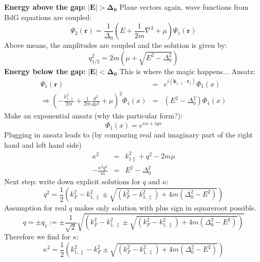 \textbf{Energy above the gap:} $\mathbf{ |E| > \Delta_0}$
Plane vectors again, wave functions from BdG equations are coupled:
\begin{equation}
\Psi_2 \left( \mathbf{r} \right)  = \frac{1}{\Delta_0} \left( E + \frac{1}{2m} \nabla^2 + \mu \right) \Psi_1 \left( \mathbf{r}  \right) 
\end{equation}
Above means, the amplitudes are coupled and the solution is given by:
\begin{equation}
q_{1/2}^2 = 2m \left( \mu + \sqrt{E^2 - \Delta_0^2} \right)
\end{equation}
\textbf{Energy below the gap:} $\mathbf{ |E| < \Delta_0}$
This is where the magic happens...
Ansatz:
\begin{eqnarray}
\Psi_1 \left( \mathbf{r} \right)  &=& e^{i ( \mathbf{k}_{1, \parallel} \cdot \mathbf{r}_{\parallel} ) } \Phi_1\left( x \right) \\
\Rightarrow \left( - \frac{k_{1, \parallel}^2}{2m} + \frac{1}{2m} \frac{d^2}{dx^2} + \mu \right)^2 \Phi_1\left( x \right) &=& (E^2 - \Delta_0^2) \Phi_1\left( x \right)
\end{eqnarray}
Make an exponential ansatz (why this particular form?):
\begin{equation}
\Phi_1(x) = e^{\kappa x + i q x}
\end{equation}
Plugging in ansatz leads to (by comparing real and imaginary part of the right hand and left hand side) 
\begin{eqnarray}
\kappa^2 &=& k_{1\parallel}^2 + q^2 - 2m\mu \\
- \frac{\kappa^2 q^2}{m} &=& E^2 - \Delta_0^2
\end{eqnarray}
Next step: write down explicit solutions for $q$ and $\kappa$:
\begin{equation}
q^2 = \frac{1}{2}\left( k_F^2 - k_{1, \parallel}^2 \pm \sqrt{ (k_F^2 - k_{1, \parallel}^2) + 4m(\Delta_0^2 - E^2)} \right)
\end{equation}
Assumption for real $q$ makes only solution with plus sign in squareroot possible. 
\begin{equation}
q = \pm q_1 := \pm \frac{1}{\sqrt{2}}\sqrt{\left( k_F^2 - k_{1, \parallel}^2 \pm \sqrt{ (k_F^2 - k_{1, \parallel}^2) + 4m(\Delta_0^2 - E^2)} \right)}
\end{equation}
Therefore we find for $\kappa$:
\begin{equation}
\kappa^2 = \frac{1}{2}\left( k_{1, \parallel}^2 - k_F^2 \pm \sqrt{ (k_F^2 - k_{1, \parallel}^2) + 4m(\Delta_0^2 - E^2)} \right)
\end{equation}
